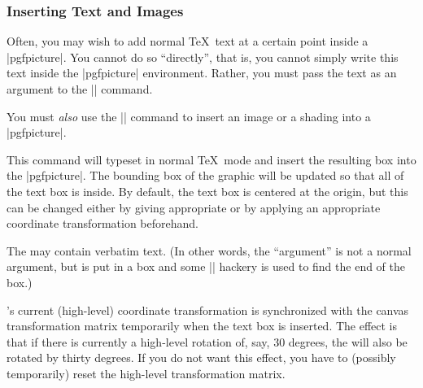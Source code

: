 \subsubsection{Inserting Text and Images}
\label{section-text-command}

Often, you may wish to add normal \TeX\ text at a certain point inside a
|{pgfpicture}|. You cannot do so ``directly'', that is, you cannot simply write
this text inside the |{pgfpicture}| environment. Rather, you must pass the text
as an argument to the |\pgftext| command.

You must \emph{also} use the |\pgftext| command to insert an image or a shading
into a |{pgfpicture}|.

\begin{command}{\pgftext{}}
    This command will typeset  in normal \TeX\ mode and insert the
    resulting box into the |{pgfpicture}|. The bounding box of the graphic will
    be updated so that all of the text box is inside. By default, the text box
    is centered at the origin, but this can be changed either by giving
    appropriate  or by applying an appropriate coordinate
    transformation beforehand.

    The  may contain verbatim text. (In other words, the 
    ``argument'' is not a normal argument, but is put in a box and some
    |\aftergroup| hackery is used to find the end of the box.)

    \pgfname's current (high-level) coordinate transformation is synchronized
    with the canvas transformation matrix temporarily when the text box is
    inserted. The effect is that if there is currently a high-level rotation
    of, say, 30 degrees, the  will also be rotated by thirty
    degrees. If you do not want this effect, you have to (possibly temporarily)
    reset the high-level transformation matrix.


\end{command}
